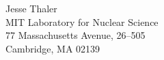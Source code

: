 Jesse Thaler\\
MIT Laboratory for Nuclear Science\\
77 Massachusetts Avenue, 26--505\\
Cambridge, MA 02139
